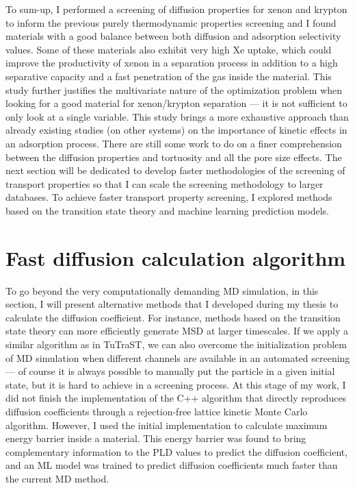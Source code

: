 \documentclass[main]{subfiles}
\begin{document}
To sum-up, I performed a screening of diffusion properties for xenon and krypton to inform the previous purely thermodynamic properties screening and I found materials with a good balance between both diffusion and adsorption selectivity values. Some of these materials also exhibit very high Xe uptake, which could improve the productivity of xenon in a separation process in addition to a high separative capacity and a fast penetration of the gas inside the material. This study further justifies the multivariate nature of the optimization problem when looking for a good material for xenon/krypton separation --- it is not sufficient to only look at a single variable. This study brings a more exhaustive approach than already existing studies (on other systems) on the importance of kinetic effects in an adsorption process.\autocite{Stanton_2022}
There are still some work to do on a finer comprehension between the diffusion properties and tortuosity and all the pore size effects. The next section will be dedicated to develop faster methodologies of the screening of transport properties so that I can scale the screening methodology to larger databases. To achieve faster transport property screening, I explored methods based on the transition state theory and machine learning prediction models.

\section{Fast diffusion calculation algorithm}\label{sct:algo_diff}

To go beyond the very computationally demanding MD simulation, in this section, I will present alternative methods that I developed during my thesis to calculate the diffusion coefficient. For instance, methods based on the transition state theory can more efficiently generate MSD at larger timescales. If we apply a similar algorithm as in TuTraST, we can also overcome the initialization problem of MD simulation when different channels are available in an automated screening --- of course it is always possible to manually put the particle in a given initial state, but it is hard to achieve in a screening process. At this stage of my work, I did not finish the implementation of the C++ algorithm that directly reproduces diffusion coefficients through a rejection-free lattice kinetic Monte Carlo algorithm. However, I used the initial implementation to calculate maximum energy barrier inside a material. This energy barrier was found to bring complementary information to the PLD values to predict the diffusion coefficient, and an ML model was trained to predict diffusion coefficients much faster than the current MD method.
\end{document}
